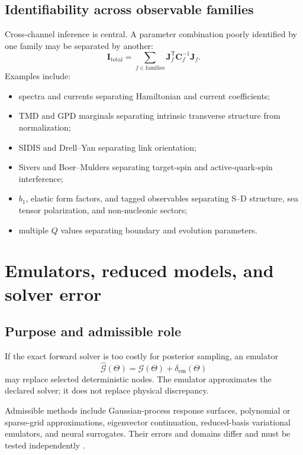 \documentclass[11pt]{article}
\newcommand{\cG}{\mathcal G}
\newcommand{\trans}{^{\mathsf T}}
\newcommand{\emul}{\mathrm{em}}
\begin{document}
\subsection{Identifiability across observable families}

Cross-channel inference is central.  A parameter combination poorly
identified by one family may be separated by another:
\begin{equation}
 \bm I_{\mathrm{total}}
 =
 \sum_{f\in\text{families}}
 \bm J_f\trans\bm C_f^{-1}\bm J_f .
 \label{eq:family-information-sum}
\end{equation}
Examples include:
\begin{itemize}
\item spectra and currents separating Hamiltonian and current coefficients;
\item TMD and GPD marginals separating intrinsic transverse structure from
      normalization;
\item SIDIS and Drell--Yan separating link orientation;
\item Sivers and Boer--Mulders separating target-spin and active-quark-spin
      interference;
\item \(b_1\), elastic form factors, and tagged observables separating S--D
      structure, sea tensor polarization, and non-nucleonic sectors;
\item multiple \(Q\) values separating boundary and evolution parameters.
\end{itemize}

\section{Emulators, reduced models, and solver error}
\label{sec:emulators}

\subsection{Purpose and admissible role}

If the exact forward solver is too costly for posterior sampling, an emulator
\begin{equation}
 \widehat{\cG}(\Theta)
 =
 \cG(\Theta)+\delta_{\emul}(\Theta)
 \label{eq:emulator-definition}
\end{equation}
may replace selected deterministic nodes.  The emulator approximates the
declared solver; it does not replace physical discrepancy.

Admissible methods include Gaussian-process response surfaces, polynomial or
sparse-grid approximations, eigenvector continuation, reduced-basis
variational emulators, and neural surrogates.  Their errors and domains differ
and must be tested independently
\cite{Frame2018,ZhangFurnstahl2022,Drischler2021}.
\end{document}
